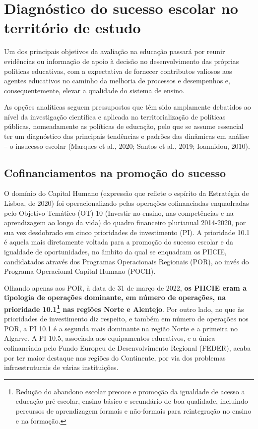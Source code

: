 \documentclass[
]{book}
\begin{document}
\hypertarget{diagnuxf3stico-do-sucesso-escolar-no-territuxf3rio-de-estudo}{%
\chapter{\texorpdfstring{\textbf{Diagnóstico do sucesso escolar no território de estudo}}{Diagnóstico do sucesso escolar no território de estudo}}\label{diagnuxf3stico-do-sucesso-escolar-no-territuxf3rio-de-estudo}}

Um dos principais objetivos da avaliação na educação passará por reunir evidências ou informação de apoio à decisão no desenvolvimento das próprias políticas educativas, com a expectativa de fornecer contributos valiosos aos agentes educativos no caminho da melhoria de processos e desempenhos e, consequentemente, elevar a qualidade do sistema de ensino.

As opções analíticas seguem pressupostos que têm sido amplamente debatidos ao nível da investigação científica e aplicada na territorialização de políticas públicas, nomeadamente as políticas de educação, pelo que se assume essencial ter um diagnóstico das principais tendências e padrões das dinâmicas em análise -- o insucesso escolar (Marques et al., 2020; Santos et al., 2019; Ioannidou, 2010).

\hypertarget{cofinanciamentos-na-promouxe7uxe3o-do-sucesso}{%
\section{\texorpdfstring{\textbf{Cofinanciamentos na promoção do sucesso}}{Cofinanciamentos na promoção do sucesso}}\label{cofinanciamentos-na-promouxe7uxe3o-do-sucesso}}

O domínio do Capital Humano (expressão que reflete o espírito da Estratégia de Lisboa, de 2020) foi operacionalizado pelas operações cofinanciadas enquadradas pelo Objetivo Temático (OT) 10 (Investir no ensino, nas competências e na aprendizagem ao longo da vida) do quadro financeiro plurianual 2014-2020, por sua vez desdobrado em cinco prioridades de investimento (PI). A prioridade 10.1 é aquela mais diretamente voltada para a promoção do sucesso escolar e da igualdade de oportunidades, no âmbito da qual se enquadram os PIICIE, candidatados através dos Programas Operacionais Regionais (POR), ao invés do Programa Operacional Capital Humano (POCH).

Olhando apenas aos POR, à data de 31 de março de 2022, \textbf{os PIICIE eram a tipologia de operações dominante, em número de operações, na prioridade 10.1\footnote{Redução do abandono escolar precoce e promoção da igualdade de acesso a educação pré-escolar, ensino básico e secundário de boa qualidade, incluindo percursos de aprendizagem formais e não-formais para reintegração no ensino e na formação.} nas regiões Norte e Alentejo}. Por outro lado, no que às prioridades de investimento diz respeito, e também em número de operações nos POR, a PI 10.1 é a segunda mais dominante na região Norte e a primeira no Algarve. A PI 10.5, associada aos equipamentos educativos, e a única cofinanciada pelo Fundo Europeu de Desenvolvimento Regional (FEDER), acaba por ter maior destaque nas regiões do Continente, por via dos problemas infraestruturais de várias instituições.
\end{document}
